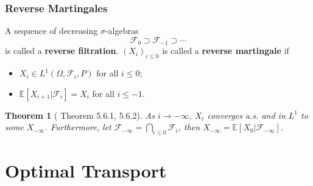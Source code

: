 \documentclass[openany]{book}
\newtheorem{theorem}{Theorem}[chapter]
\theoremstyle{definition}
\theoremstyle{remark}
\begin{document}
\section{Reverse Martingales}
A sequence of decreasing $\sigma$-algebras
\begin{equation*}
    \mathcal{F}_0\supset \mathcal{F}_{-1}\supset\cdots
\end{equation*}
is called a \textbf{reverse filtration}. $(X_i)_{i\le0}$ is called a \textbf{reverse martingale} if
\begin{itemize}
    \item $X_i\in L^1(\Omega,\mathcal{F}_i,P)$ for all $i\le0$;
    \item $\mathbb{E}[X_{i+1}|\mathcal{F}_i]=X_i$ for all $i\le-1$.
\end{itemize}
\begin{theorem}[\cite{D10} Theorem 5.6.1, 5.6.2]
    As $i\to-\infty$, $X_i$ converges a.s. and in $L^1$ to some $X_{-\infty}$. Furthermore, let $\mathcal{F}_{-\infty}=\bigcap_{i\le0}\mathcal{F}_i$, then $X_{-\infty}=\mathbb{E}[X_0|\mathcal{F}_{-\infty}]$.
\end{theorem}

\part{Optimal Transport}
\end{document}
